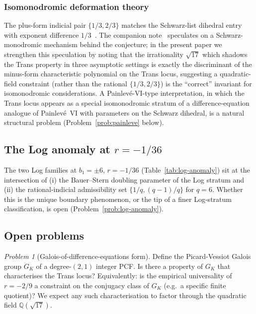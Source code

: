 \documentclass[11pt]{amsart}
\theoremstyle{definition}
\theoremstyle{remark}
\newtheorem{problem}{Problem}
\newcommand{\Q}{\mathbb{Q}}
\begin{document}
\subsubsection{Isomonodromic deformation theory}
The plus-form indicial pair $\{1/3,2/3\}$ matches the Schwarz-list
dihedral entry with exponent difference $1/3$~\cite{Schwarz}.  The
companion note~\cite{TRINote} speculates on a Schwarz-monodromic
mechanism behind the conjecture; in the present paper we strengthen
this speculation by noting that the irrationality $\sqrt{17}$ which
shadows the Trans property in three asymptotic settings is exactly
the discriminant of the minus-form characteristic polynomial on the
Trans locus, suggesting a quadratic-field constraint (rather than
the rational $\{1/3,2/3\}$) is the ``correct'' invariant for
isomonodromic considerations.  A Painlevé-VI-type interpretation,
in which the Trans locus appears as a special isomonodromic stratum
of a difference-equation analogue of Painlevé~VI with parameters on
the Schwarz dihedral, is a natural structural problem
(Problem~\ref{prob:painleve} below).

\subsection{The Log anomaly at $r=-1/36$}

The two Log families at $b_1=\pm 6$, $r=-1/36$ (Table~\ref{tab:log-anomaly})
sit at the intersection of (i) the Bauer--Stern doubling parameter
of the Log stratum and (ii) the rational-indicial admissibility set
$\{1/q,(q-1)/q\}$ for $q=6$.  Whether this is the unique boundary
phenomenon, or the tip of a finer Log-stratum classification, is
open (Problem~\ref{prob:log-anomaly}).

\subsection{Open problems}

\begin{problem}[Galois-of-difference-equations form]
\label{prob:galois}
Define the Picard-Vessiot Galois group $G_K$ of a degree-$(2,1)$
integer PCF.  Is there a property of $G_K$ that characterises the
Trans locus?  Equivalently: is the empirical universality of
$r=-2/9$ a constraint on the conjugacy class of $G_K$ (e.g.\ a
specific finite quotient)?  We expect any such characterisation to
factor through the quadratic field $\Q(\sqrt{17})$.
\end{problem}
\end{document}
